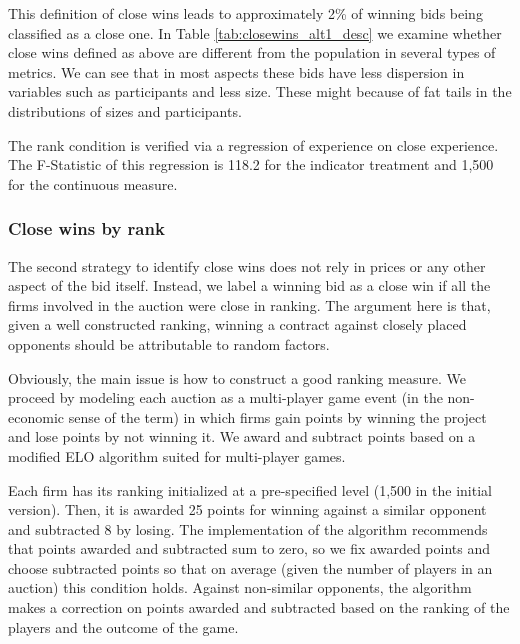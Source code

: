 This definition of close wins leads to approximately 2\% of winning bids being classified as a close one. In Table \ref{tab:closewins_alt1_desc} we examine whether close wins defined as above are different from the population in several types of metrics. We can see that in most aspects these bids have less dispersion in variables such as participants and less size. These might because of fat tails in the distributions of sizes and participants.



The rank condition is verified via a regression of experience on close experience. The F-Statistic of this regression is 118.2 for the indicator treatment and 1,500 for the continuous measure.

\subsubsection{Close wins by rank}

The second strategy to identify close wins does not rely in prices or any other aspect of the bid itself. Instead, we label a winning bid as a close win if all the firms involved in the auction were close in ranking. The argument here is that, given a well constructed ranking, winning a contract against closely placed opponents should be attributable to random factors.

Obviously, the main issue is how to construct a good ranking measure. We proceed by  modeling each auction as a multi-player game event (in the non-economic sense of the term) in which firms gain points by winning the project and lose points by not winning it. We award and subtract points based on a modified ELO algorithm suited for multi-player games.

Each firm has its ranking initialized at a pre-specified level (1,500 in the initial version). Then, it is awarded 25 points for winning against a similar opponent and subtracted 8 by losing. The implementation of the algorithm recommends that points awarded and subtracted sum to zero, so we fix awarded points and choose subtracted points so that on average (given the number of players in an auction) this condition holds. Against non-similar opponents, the algorithm makes a correction on points awarded and subtracted based on the ranking of the players and the outcome of the game.


